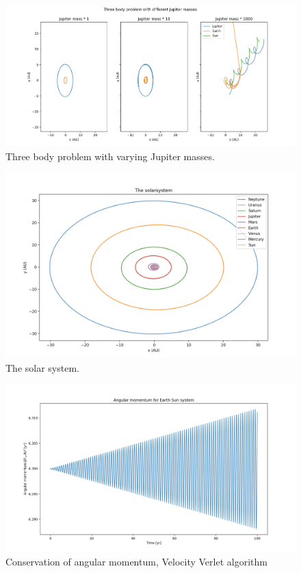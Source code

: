\documentclass{article}
\begin{document}
\begin{figure}[H]
	\centering
	\includegraphics[width=120mm]{Jup_mass}
	\caption{Three body problem with varying Jupiter masses.}
	\label{fig:Jup_mass}
\end{figure}

\begin{figure}[H]
	\centering
	\includegraphics[width=120mm]{Solar}
	\caption{The solar system.}
	\label{fig:Solar}
\end{figure}

\begin{figure}[H]
	\centering
	\includegraphics[width=120mm]{ang_mom_con.png}
	\caption{Conservation of angular momentum, Velocity Verlet algorithm  }
	\label{fig:angmon}
\end{figure}
\end{document}
